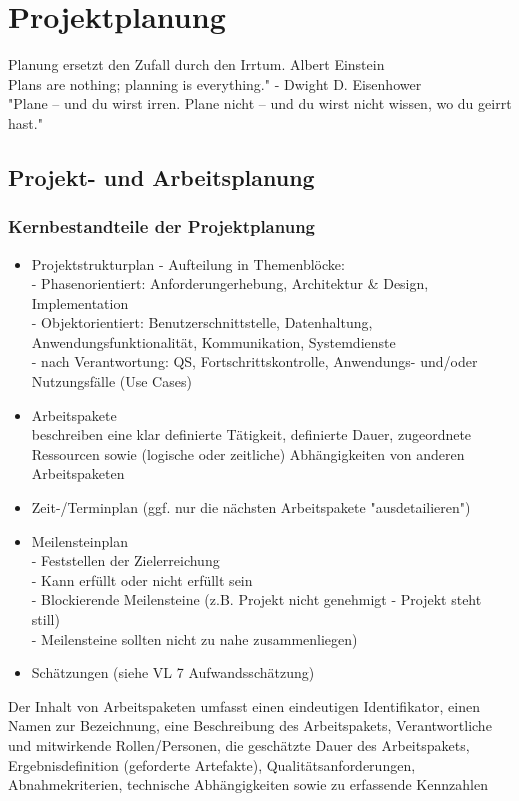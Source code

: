 \chapter{Projektplanung}

Planung ersetzt den Zufall durch den Irrtum. Albert Einstein \\
Plans are nothing; planning is everything." - Dwight D. Eisenhower \\
"Plane – und du wirst irren. Plane nicht – und du wirst nicht wissen, wo du geirrt hast."
\section{Projekt- und Arbeitsplanung}

\subsection{Kernbestandteile der Projektplanung}
\begin{itemize}
	\item Projektstrukturplan - Aufteilung in Themenblöcke: \\ 
	- Phasenorientiert: Anforderungerhebung, Architektur \& Design, Implementation \\
	- Objektorientiert: Benutzerschnittstelle, Datenhaltung, Anwendungsfunktionalität, Kommunikation, Systemdienste \\
	- nach Verantwortung: QS, Fortschrittskontrolle, Anwendungs- und/oder Nutzungsfälle (Use Cases)
	\item Arbeitspakete \\
	beschreiben eine klar definierte Tätigkeit, definierte Dauer, zugeordnete Ressourcen sowie (logische oder zeitliche) Abhängigkeiten von anderen Arbeitspaketen 
	\item Zeit-/Terminplan (ggf. nur die nächsten Arbeitspakete "ausdetailieren")
	\item Meilensteinplan \\
	- Feststellen der Zielerreichung \\
	- Kann erfüllt oder nicht erfüllt sein \\
	- Blockierende Meilensteine (z.B. Projekt nicht genehmigt - Projekt steht still)\\
	-  Meilensteine sollten nicht zu nahe zusammenliegen)
	\item Schätzungen (siehe VL 7 Aufwandsschätzung)
\end{itemize}

Der Inhalt von Arbeitspaketen umfasst einen eindeutigen Identifikator, einen Namen zur Bezeichnung, eine Beschreibung des Arbeitspakets, Verantwortliche und mitwirkende Rollen/Personen, die geschätzte Dauer des Arbeitspakets, Ergebnisdefinition (geforderte Artefakte), Qualitätsanforderungen, Abnahmekriterien, technische Abhängigkeiten sowie zu erfassende Kennzahlen


